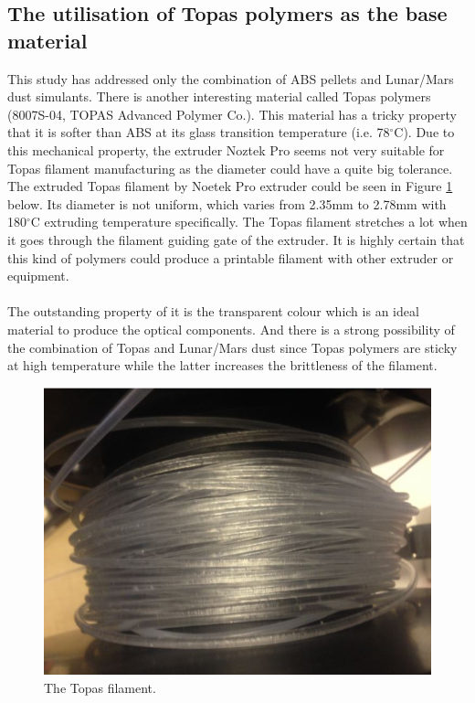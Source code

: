 \subsection{The utilisation of Topas polymers as the base material}
This study has addressed only the combination of ABS pellets and Lunar/Mars dust simulants. There is another interesting material called Topas polymers (8007S-04, TOPAS Advanced Polymer Co.). This material has a tricky property that it is softer than ABS at its glass transition temperature (i.e. 78$^{\circ}$C). Due to this mechanical property, the extruder Noztek Pro seems not very suitable for Topas filament manufacturing as the diameter could have a quite big tolerance. The extruded Topas filament by Noetek Pro extruder could be seen in Figure \ref{Fig:Topaz polymer} below. Its diameter is not uniform, which varies from 2.35mm to 2.78mm with 180$^{\circ}$C extruding temperature specifically. The Topas filament stretches a lot when it goes through the filament guiding gate of the extruder. It is highly certain that this kind of polymers could produce a printable filament with other extruder or equipment. \\
\\
The outstanding property of it is the transparent colour which is an ideal material to produce the optical components. And there is a strong possibility of the combination of Topas and Lunar/Mars dust since Topas polymers are sticky at high temperature while the latter increases the brittleness of the filament.  
\begin{figure}[htbp]
  \centering
  \includegraphics[scale=0.5]{Figs5//topaz_filament.JPG}
  \caption[The Topas filament]{\footnotesize The Topas filament.}
  \label{Fig:Topaz polymer}
\end{figure}

